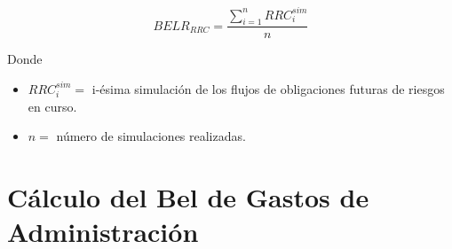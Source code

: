\documentclass[11pt,twoside,openright,spanish]{report}
\numberwithin{equation}{chapter}
\numberwithin{figure}{chapter}
\numberwithin{table}{chapter}
\begin{document}
	 

	
	\begin{equation}
		BELR_{RRC}^{}=\frac{\sum _{i=1}^{n}RRC_{i}^{sim}}{n}
		\label{eq9}
		\end{equation}
			


 
	
	Donde
	
	 
		\begin{itemize}
		\setlength\itemsep{-0.5em}
	\item $RRC_{i}^{sim}=$ i-ésima simulación de los flujos de obligaciones futuras de riesgos en curso.
	
	\item $n=$ número de simulaciones realizadas.
	\end{itemize}
	
\begin{comment}	
	 
	Para Salud Individual Dental, el $BELR_{RRC}$ se calculará como el producto de la prima de tarifa no devengada y el factor de siniestralidad última de mercado proporcionado por la Comisión Nacional de Seguros y Fianzas:


	 

$ $

 
	
	
	{\centering
		$BELR_{RRC}^{}=PTND_{} \cdot FS_{BEL}^{RRC}$
		\noindent
		
	}
	
	 

$ $

 
	
	Donde
	
	 
	
	$PTND_{}=$ Prima de tarifa no devengada.
\begin{comment}	
	$FS_{BEL}^{RRC}=$ Factor de Siniestralidad última con información de mercado.
	
	 

$ $

 

	El cálculo del $BELR_{RRC}$, se realizará de forma trimestral y se prorrateara con el vigor de la valuación del cierre de mes a fin de obtener la reserva de riesgos en curso.

\end{comment}
	
	 
	\section{Cálculo del Bel de Gastos de Administración}
	 
\end{document}
